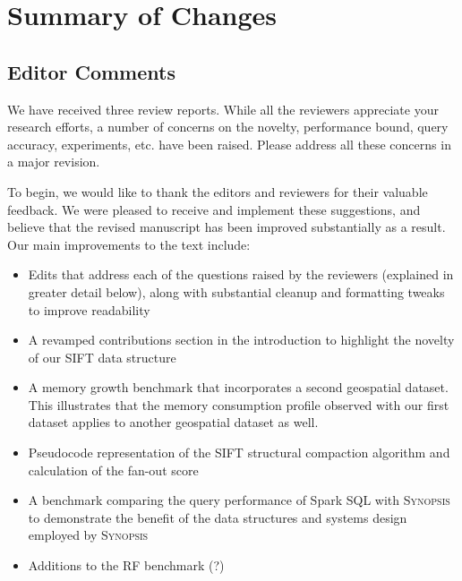 \documentclass{article}
\begin{document}
\section*{Summary of Changes}\label{summary-of-changes}
\subsection*{Editor Comments}\label{editor-comments}

We have received three review reports. While all the reviewers
appreciate your research efforts, a number of concerns on the novelty,
performance bound, query accuracy, experiments, etc. have been raised.
Please address all these concerns in a major revision.

\begin{tcolorbox}
To begin, we would like to thank the editors and reviewers for their
valuable feedback. We were pleased to receive and implement these
suggestions, and believe that the revised manuscript has been improved
substantially as a result. Our main improvements to the text include:

\begin{itemize}
\item
  Edits that address each of the questions raised by the reviewers
  (explained in greater detail below), along with substantial cleanup
  and formatting tweaks to improve readability

\item
  A revamped contributions section in the introduction to highlight the
  novelty of our SIFT data structure

\item
  A memory growth benchmark that incorporates a second geospatial
  dataset. This illustrates that the memory consumption profile observed
  with our first dataset applies to another geospatial dataset as well.

\item
  Pseudocode representation of the SIFT structural compaction algorithm
  and calculation of the fan-out score

\item A benchmark comparing the query performance of Spark SQL with \textsc{Synopsis} to demonstrate the benefit of the data structures and systems design employed by \textsc{Synopsis}

\item
  Additions to the RF benchmark (?)
\end{itemize}
\end{tcolorbox}
\end{document}
